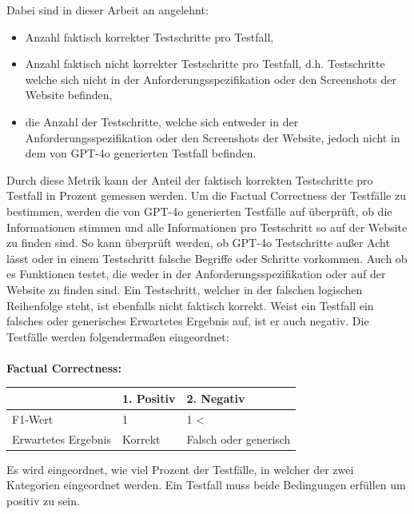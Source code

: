 \documentclass[12pt,toc=bib,toc=listof]{scrreprt}
\begin{document}
\noindent Dabei sind in dieser Arbeit an \textcite{Ragas2025} angelehnt:
\begin{itemize}
    \item {} Anzahl faktisch korrekter Testschritte pro Testfall,
    \item {} Anzahl faktisch nicht korrekter Testschritte pro Testfall, d.h. Testschritte welche sich nicht in der Anforderungsspezifikation oder den Screenshots der Website befinden,
    \item {} die Anzahl der Testschritte, welche sich entweder in der Anforderungsspezifikation oder den Screenshots der Website, jedoch nicht in dem von GPT-4o generierten Testfall befinden.
\end{itemize}
Durch diese Metrik kann der Anteil der faktisch korrekten Testschritte pro Testfall in Prozent gemessen werden. Um die Factual Correctness der Testfälle zu bestimmen, werden die von GPT-4o generierten Testfälle auf \textcite{OpenCart2025} überprüft, ob die Informationen stimmen und alle Informationen pro Testschritt so auf der Website \textcite{OpenCart2025} zu finden sind. So kann überprüft werden, ob GPT-4o Testschritte außer Acht lässt oder in einem Testschritt falsche Begriffe oder Schritte vorkommen. Auch ob es Funktionen testet, die weder in der Anforderungsspezifikation oder auf der Website zu finden sind.  Ein Testschritt, welcher in der falschen logischen Reihenfolge steht, ist ebenfalls nicht faktisch korrekt. Weist ein Testfall ein falsches oder generisches \glqq Erwartetes Ergebnis\grqq{} auf, ist er auch negativ. Die Testfälle werden folgendermaßen eingeordnet:\\
\\
\textbf{Factual Correctness:} 
\begin{table}[H]
 \begin{center}
\begin{tabular}{|l|l|l|}
\hline
               & 1. Positiv & 2. Negativ  \\ \hline
F1-Wert  & 1 & 1 <        \\ \hline
Erwartetes Ergebnis  & Korrekt & Falsch oder generisch       \\ \hline

\end{tabular}
\end{center}
\end{table}
\noindent Es wird eingeordnet, wie viel Prozent der Testfälle, in welcher der zwei Kategorien eingeordnet werden. Ein Testfall muss beide Bedingungen erfüllen um positiv zu sein.
\newpage
\end{document}
